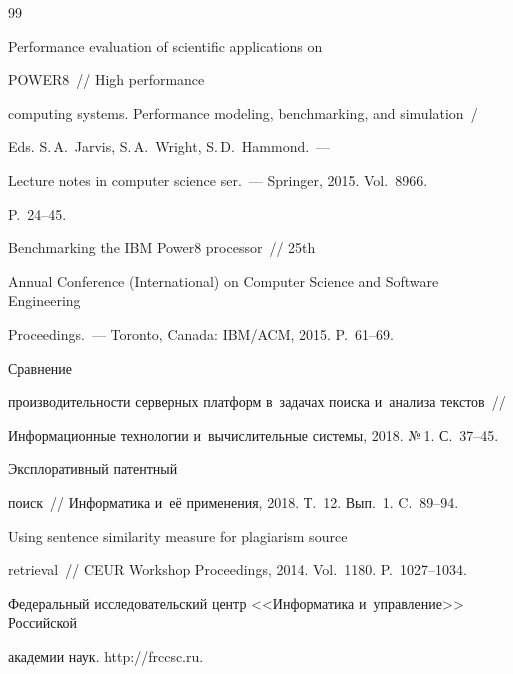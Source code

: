 {{\begin{thebibliography}{99}

 Performance evaluation of scientific applications on 

\mbox{POWER8}~/\!\!/ High performance 

computing systems. Performance modeling, benchmarking, and simulation~/

Eds. S.\,A.~Jarvis, S.\,A.~Wright, S.\,D.~Hammond.~---

Lecture notes in computer science ser.~--- Springer, 2015. Vol.~8966.   

P.~24--45.


 Benchmarking the IBM Power8 processor~/\!\!/ 25th 

Annual Conference (International) on Computer Science and Software Engineering

Proceedings.~--- Toronto, Canada: IBM\!/\!ACM, 2015. P.~61--69.


 Сравнение 

про\-из\-во\-ди\-тель\-ности серверных платформ в~задачах поиска и~анализа текстов~/\!\!/ 

Информационные технологии и~вы\-чис\-ли\-тель\-ные сис\-те\-мы, 2018. №\,1. С.~37--45.


 Эксплоративный патентный 

поиск~/\!\!/ Информатика и~её применения, 2018. Т.~12. Вып.~1. C.~89--94.


 Using sentence similarity measure for plagiarism source 

retrieval~/\!\!/ CEUR Workshop Proceedings, 2014. Vol.~1180. P.~1027--1034.


Федеральный исследовательский центр <<Информатика и~управ\-ле\-ние>> Российской 

академии наук. {\sf http://frccsc.ru.}

        \end{thebibliography}

} }





